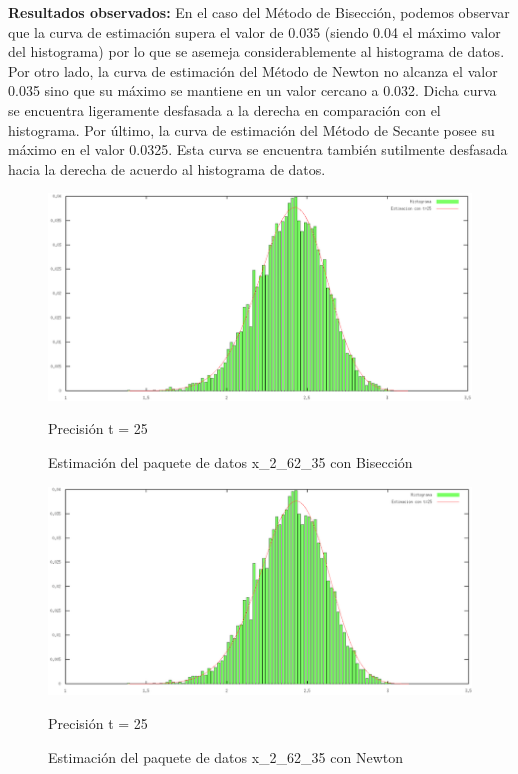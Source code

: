 \documentclass[10pt, a4paper]{article}
\begin{document}
\large{\textbf{Resultados observados:}} En el caso del M\'etodo de Bisecci\'on, podemos observar que la curva de estimaci\'on supera el valor de 0.035 (siendo 0.04 el m\'aximo valor del histograma) por lo que se asemeja considerablemente al histograma de datos. Por otro lado, la curva de estimaci\'on del M\'etodo de Newton no alcanza el valor 0.035 sino que su m\'aximo se mantiene en un valor cercano a 0.032. Dicha curva se encuentra ligeramente desfasada a la derecha en comparaci\'on con el histograma. Por \'ultimo, la curva de estimaci\'on del M\'etodo de Secante posee su m\'aximo en el valor 0.0325. Esta curva se encuentra tambi\'en sutilmente desfasada hacia la derecha de acuerdo al histograma de datos.\newline

\begin{figure}[H]
\begin{center}
\includegraphics[width=370pt]{./Biseccion_25.png}
\caption[h]{Estimaci\'on del paquete de datos x\_2\_62\_35 con Bisecci\'on}{Precisi\'on t = 25}
\end{center}
\end{figure}

\begin{figure}[H] %
\begin{center}
\includegraphics[width=370pt]{./Newton_25.png}
\caption[h]{Estimaci\'on del paquete de datos x\_2\_62\_35 con Newton}{Precisi\'on t = 25}
\end{center}
\end{figure}
\end{document}
